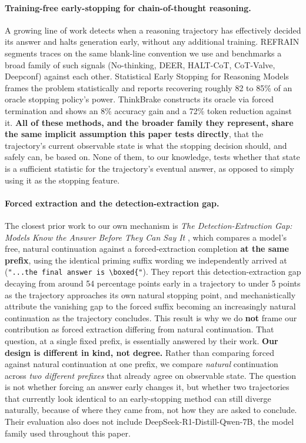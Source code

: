 \documentclass{article}
\begin{document}
\paragraph{Training-free early-stopping for chain-of-thought reasoning.} A growing line of work detects when a reasoning trajectory has effectively decided its answer and halts generation early, without any additional training. REFRAIN \citep{refrain2026} segments traces on the same blank-line convention we use and benchmarks a broad family of such signals (No-thinking, DEER, HALT-CoT, CoT-Valve, Deepconf) against each other. Statistical Early Stopping for Reasoning Models \citep{statisticalearlystopping2026} frames the problem statistically and reports recovering roughly 82 to 85\% of an oracle stopping policy's power. ThinkBrake \citep{thinkbrake2026} constructs its oracle via forced termination and shows an 8\% accuracy gain and a 72\% token reduction against it. \textbf{All of these methods, and the broader family they represent, share the same implicit assumption this paper tests directly}, that the trajectory's current observable state is what the stopping decision should, and safely can, be based on. None of them, to our knowledge, tests whether that state is a sufficient statistic for the trajectory's eventual answer, as opposed to simply using it as the stopping feature.

\paragraph{Forced extraction and the detection-extraction gap.} The closest prior work to our own mechanism is \emph{The Detection-Extraction Gap: Models Know the Answer Before They Can Say It} \citep{detectionextractiongap2026}, which compares a model's free, natural continuation against a forced-extraction completion \textbf{at the same prefix}, using the identical priming suffix wording we independently arrived at (\texttt{"...the final answer is \textbackslash boxed\{"}). They report this detection-extraction gap decaying from around 54 percentage points early in a trajectory to under 5 points as the trajectory approaches its own natural stopping point, and mechanistically attribute the vanishing gap to the forced suffix becoming an increasingly natural continuation as the trajectory concludes. This result is why we do \textbf{not} frame our contribution as forced extraction differing from natural continuation. That question, at a single fixed prefix, is essentially answered by their work. \textbf{Our design is different in kind, not degree.} Rather than comparing forced against natural continuation at one prefix, we compare \emph{natural} continuation across \emph{two different prefixes} that already agree on observable state. The question is not whether forcing an answer early changes it, but whether two trajectories that currently look identical to an early-stopping method can still diverge naturally, because of where they came from, not how they are asked to conclude. Their evaluation also does not include DeepSeek-R1-Distill-Qwen-7B, the model family used throughout this paper.
\end{document}
